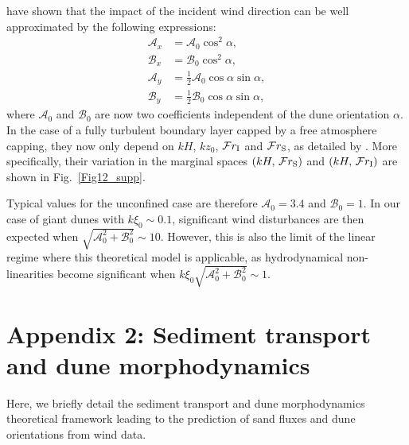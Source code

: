 \citet{Andreotti2012} have shown that the impact of the incident wind direction can be well approximated by the following expressions:
\begin{align}
  \mathcal{A}_{x} & = \mathcal{A}_{0}\cos^{2}\alpha, \\
  \mathcal{B}_{x} & = \mathcal{B}_{0}\cos^{2}\alpha, \\
  \mathcal{A}_{y} & = \displaystyle\frac{1}{2}\mathcal{A}_{0}\cos\alpha \sin\alpha, \\
  \mathcal{B}_{y} & = \displaystyle\frac{1}{2}\mathcal{B}_{0}\cos\alpha \sin\alpha,
\end{align}
where $\mathcal{A}_{0}$ and $\mathcal{B}_{0}$ are now two coefficients independent of the dune orientation $\alpha$. In the case of a fully turbulent boundary layer capped by a free atmosphere capping, they now only depend on $k H$, $k z_{0}$, $\mathcal{F}r_{\textup{I}}$ and $\mathcal{F}r_{\textup{S}}$, as detailed by \citet{andreotti2009}. More specifically, their variation in the marginal spaces $(k H,\, \mathcal{F}r_{\textup{S}})$ and $(k H,\, \mathcal{F}r_{\textup{I}})$ are shown in Fig.~\ref{Fig12_supp}.

Typical values for the unconfined case are therefore $\mathcal{A}_{0} = 3.4$ and $\mathcal{B}_{0} = 1$. In our case of giant dunes with $k\xi_{0} \sim 0.1$, significant wind disturbances are then expected when $\sqrt{\mathcal{A}_{0}^{2} + \mathcal{B}_{0}^{2}} \sim 10$. However, this is also the limit of the linear regime where this theoretical model is applicable, as hydrodynamical non-linearities become significant when $k\xi_{0}\sqrt{\mathcal{A}_{0}^{2} + \mathcal{B}_{0}^{2}} \sim 1$.

\section*{Appendix 2: Sediment transport and dune morphodynamics}

Here, we briefly detail the sediment transport and dune morphodynamics theoretical framework leading to the prediction of sand fluxes and dune orientations from wind data.

